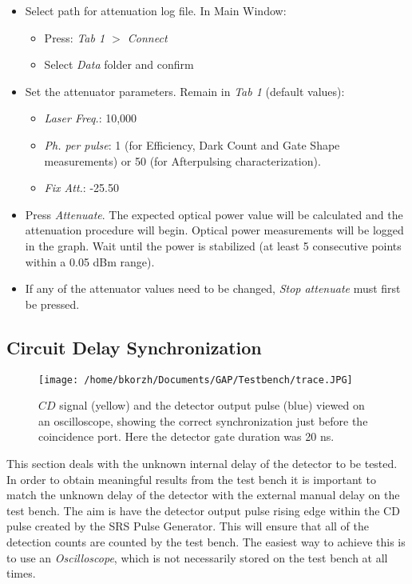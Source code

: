\documentclass{article}
\begin{document}
\begin{itemize}

\item
Select path for attenuation log file. In Main Window:
\begin{itemize}
\item
Press: \emph{Tab 1 $>$ Connect}
\item 
Select \emph{Data} folder and confirm
\end{itemize}

\label{sec:soft_init}

\item
Set the attenuator parameters. Remain in \emph{Tab 1} (default values):
\begin{itemize}
\item
\emph{Laser Freq.}: 10,000
\item
\emph{Ph. per pulse}: 1 (for Efficiency, Dark Count and Gate Shape measurements) or 50 (for Afterpulsing characterization). 
\item
\emph{Fix Att.}: -25.50
\end{itemize}
\item
Press \emph{Attenuate}. The expected optical power value will be calculated and the attenuation procedure will begin. Optical power measurements will be logged in the graph. Wait until the power is stabilized (at least 5 consecutive points within a 0.05 dBm range).
\item
If any of the attenuator values need to be changed, \emph{Stop attenuate} must first be pressed. 

\end{itemize}

\subsection{Circuit Delay Synchronization}

\begin{figure}
\centering
\texttt{[image: /home/bkorzh/Documents/GAP/Testbench/trace.JPG]}
\caption{$CD$ signal (yellow) and the detector output pulse (blue) viewed on an oscilloscope, showing the correct synchronization just before the coincidence port. Here the detector gate duration was 20 ns.}
\label{trace}
\end{figure}

This section deals with the unknown internal delay of the detector to be tested. In order to obtain meaningful results from the test bench it is important to match the unknown delay of the detector with the external manual delay on the test bench. The aim is have the detector output pulse rising edge within the CD pulse created by the SRS Pulse Generator. This will ensure that all of the detection counts are counted by the test bench. The easiest way to achieve this is to use an \emph{Oscilloscope}, which is not necessarily stored on the test bench at all times.
\end{document}
